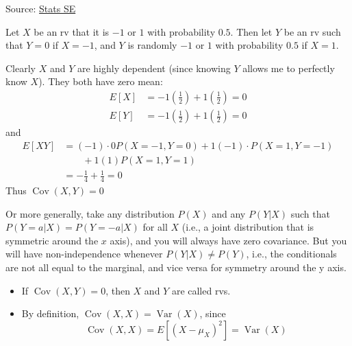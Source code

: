 \documentclass[notoc,notitlepage]{tufte-book}
\DeclareMathOperator{\Var}{Var }
\DeclareMathOperator{\Cov}{Cov }
\begin{document}
\begin{eg}
  Source: \href{https://stats.stackexchange.com/questions/12842/covariance-and-independence\#12844}{Stats SE}

  Let $X$ be an rv that it is $ - 1$ or $1$ with probability $0.5$. Then let $Y$ be an rv such that $Y=0$ if $X=-1$, and $Y$ is randomly $-1$ or $1$ with probability $0.5$ if $X=1$.

  Clearly $X$ and $Y$ are highly dependent (since knowing $Y$ allows me to perfectly know $X$). They both have zero mean: 
  \begin{align*}
    E[X] &= -1 \left(\frac{1}{2}\right) + 1 \left(\frac{1}{2}\right) = 0 \\
    E[Y] &= -1 \left(\frac{1}{2}\right) + 1 \left(\frac{1}{2}\right) = 0
  \end{align*}
  and
  \begin{align*}
    E[ XY ] &= (-1) \cdot 0 P(X = -1, Y = 0) + 1 (-1) \cdot P(X = 1, Y = -1) \\
      &\qquad + 1 (1) P(X = 1, Y = 1) \\
      &= - \frac{1}{4} + \frac{1}{4} = 0
  \end{align*}
  Thus $\Cov(X, Y) = 0$

  Or more generally, take any distribution $P(X)$ and any $P(Y | X)$ such that $P(Y = a | X)=P(Y=-a | X)$ for all $X$ (i.e., a joint distribution that is symmetric around the $x$ axis), and you will always have zero covariance. But you will have non-independence whenever $P(Y | X) \neq P(Y)$, i.e., the conditionals are not all equal to the marginal, and vice versa for symmetry around the y axis. 
\end{eg}

\begin{note}
  \begin{itemize}
    \item If $\Cov(X, Y) = 0$, then $X$ and $Y$ are called  rvs.
    \item By definition, $\Cov(X, X) = \Var(X)$, since
      \begin{equation*}
        \Cov(X, X) = E[ (X - \mu_X)^2 ] = \Var(X)
      \end{equation*}
  \end{itemize}
\end{note}
\end{document}
